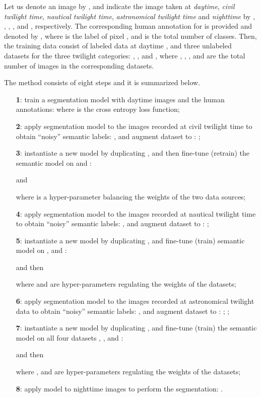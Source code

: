 \documentclass[letterpaper, 10 pt, conference]{ieeeconf}
\begin{document}
Let us denote an image by , and indicate the image taken at \emph{daytime}, \emph{civil twilight time}, \emph{nautical twilight time}, \emph{astronomical twilight time} and \emph{nighttime} by  , , , , and , respectively. 
The corresponding human annotation for  is provided and denoted by ,  where   is the label of pixel , and  is the total number of classes. Then, the training data consist of labeled data at daytime , and three unlabeled datasets for the three twilight categories: , , and , where , , , and  are the total number of images in the corresponding datasets.  


The method consists of eight steps and it is summarized below. 
\begin{enumerate}
\item [\textbf{1}:]  train a segmentation model with daytime images and the human annotations: 
 where  is the cross entropy loss function;  \label{item1} 
\item [\textbf{2}:] apply  segmentation model  to the images recorded at civil twilight time to obtain ``noisy'' semantic labels:  , and augment dataset  to : ;  \label{item2} 
\item [\textbf{3}:] instantiate a new model  by duplicating , and then fine-tune (retrain) the semantic model on  and : 

and  

where  is a hyper-parameter balancing the weights of the two data sources; \label{item3}
\item [\textbf{4}:] apply segmentation model  to the images recorded at nautical twilight time to obtain ``noisy'' semantic labels:  , and augment dataset  to : ; 
\label{item4} 
\item [\textbf{5}:] instantiate a new model  by duplicating , and fine-tune (train) semantic model on ,  and : 

and then 

where  and  are  hyper-parameters regulating the weights of the datasets; \label{item5}
\item [\textbf{6}:] apply segmentation model  to the images recorded at astronomical twilight data to obtain ``noisy'' semantic labels:  , and augment dataset  to : ; 
;  \label{item6} 
\item [\textbf{7}:] instantiate a new model  by duplicating , and fine-tune (train) the semantic model on all four datasets , ,  and : 

and then 

where ,  and  are hyper-parameters regulating the weights of the datasets; 
\label{item7}
\item [\textbf{8}:] apply model  to nighttime images to perform the segmentation: .
\end{enumerate}
\end{document}
